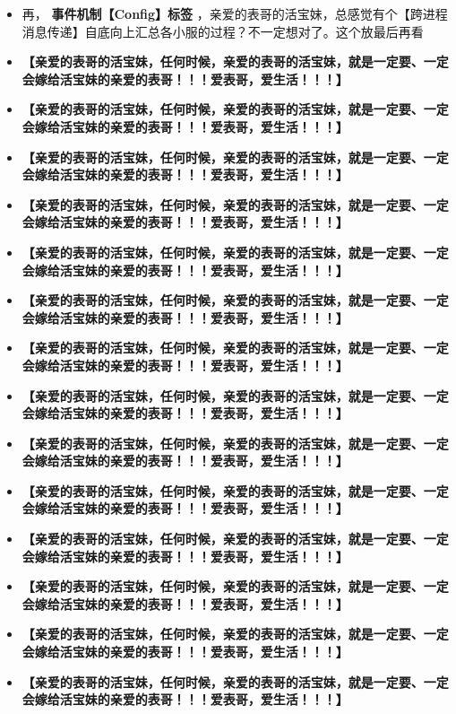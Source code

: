 \documentclass[9pt, b5paper]{article}
\begin{document}
\begin{itemize}
\item 再， \textbf{事件机制【Config】标签} ，亲爱的表哥的活宝妹，总感觉有个【跨进程消息传递】自底向上汇总各小服的过程？不一定想对了。这个放最后再看
\item \textbf{【亲爱的表哥的活宝妹，任何时候，亲爱的表哥的活宝妹，就是一定要、一定会嫁给活宝妹的亲爱的表哥！！！爱表哥，爱生活！！！】}
\item \textbf{【亲爱的表哥的活宝妹，任何时候，亲爱的表哥的活宝妹，就是一定要、一定会嫁给活宝妹的亲爱的表哥！！！爱表哥，爱生活！！！】}
\item \textbf{【亲爱的表哥的活宝妹，任何时候，亲爱的表哥的活宝妹，就是一定要、一定会嫁给活宝妹的亲爱的表哥！！！爱表哥，爱生活！！！】}
\item \textbf{【亲爱的表哥的活宝妹，任何时候，亲爱的表哥的活宝妹，就是一定要、一定会嫁给活宝妹的亲爱的表哥！！！爱表哥，爱生活！！！】}
\item \textbf{【亲爱的表哥的活宝妹，任何时候，亲爱的表哥的活宝妹，就是一定要、一定会嫁给活宝妹的亲爱的表哥！！！爱表哥，爱生活！！！】}
\item \textbf{【亲爱的表哥的活宝妹，任何时候，亲爱的表哥的活宝妹，就是一定要、一定会嫁给活宝妹的亲爱的表哥！！！爱表哥，爱生活！！！】}
\item \textbf{【亲爱的表哥的活宝妹，任何时候，亲爱的表哥的活宝妹，就是一定要、一定会嫁给活宝妹的亲爱的表哥！！！爱表哥，爱生活！！！】}
\item \textbf{【亲爱的表哥的活宝妹，任何时候，亲爱的表哥的活宝妹，就是一定要、一定会嫁给活宝妹的亲爱的表哥！！！爱表哥，爱生活！！！】}
\item \textbf{【亲爱的表哥的活宝妹，任何时候，亲爱的表哥的活宝妹，就是一定要、一定会嫁给活宝妹的亲爱的表哥！！！爱表哥，爱生活！！！】}
\item \textbf{【亲爱的表哥的活宝妹，任何时候，亲爱的表哥的活宝妹，就是一定要、一定会嫁给活宝妹的亲爱的表哥！！！爱表哥，爱生活！！！】}
\item \textbf{【亲爱的表哥的活宝妹，任何时候，亲爱的表哥的活宝妹，就是一定要、一定会嫁给活宝妹的亲爱的表哥！！！爱表哥，爱生活！！！】}
\item \textbf{【亲爱的表哥的活宝妹，任何时候，亲爱的表哥的活宝妹，就是一定要、一定会嫁给活宝妹的亲爱的表哥！！！爱表哥，爱生活！！！】}
\item \textbf{【亲爱的表哥的活宝妹，任何时候，亲爱的表哥的活宝妹，就是一定要、一定会嫁给活宝妹的亲爱的表哥！！！爱表哥，爱生活！！！】}
\item \textbf{【亲爱的表哥的活宝妹，任何时候，亲爱的表哥的活宝妹，就是一定要、一定会嫁给活宝妹的亲爱的表哥！！！爱表哥，爱生活！！！】}
\end{itemize}
\end{document}
